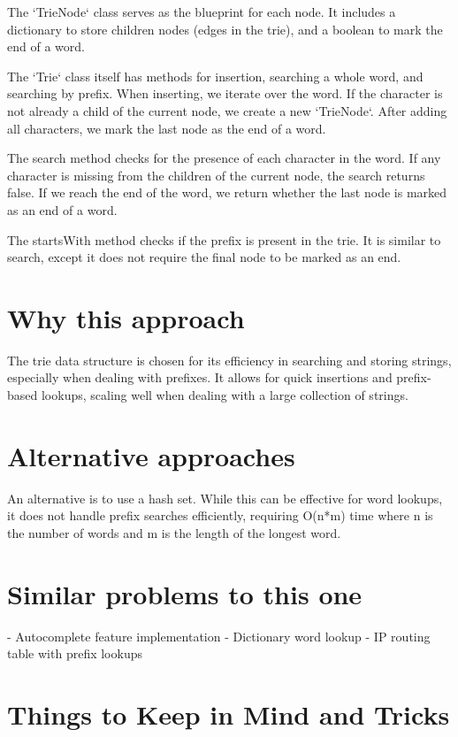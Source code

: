 The `TrieNode` class serves as the blueprint for each node. It includes a dictionary to store children nodes (edges in the trie), and a boolean to mark the end of a word.

The `Trie` class itself has methods for insertion, searching a whole word, and searching by prefix. When inserting, we iterate over the word. If the character is not already a child of the current node, we create a new `TrieNode`. After adding all characters, we mark the last node as the end of a word.

The search method checks for the presence of each character in the word. If any character is missing from the children of the current node, the search returns false. If we reach the end of the word, we return whether the last node is marked as an end of a word.

The startsWith method checks if the prefix is present in the trie. It is similar to search, except it does not require the final node to be marked as an end.

\section*{Why this approach}

The trie data structure is chosen for its efficiency in searching and storing strings, especially when dealing with prefixes. It allows for quick insertions and prefix-based lookups, scaling well when dealing with a large collection of strings.

\section*{Alternative approaches}

An alternative is to use a hash set. While this can be effective for word lookups, it does not handle prefix searches efficiently, requiring O(n*m) time where n is the number of words and m is the length of the longest word.

\section*{Similar problems to this one}

- Autocomplete feature implementation
- Dictionary word lookup
- IP routing table with prefix lookups

\section*{Things to Keep in Mind and Tricks}

